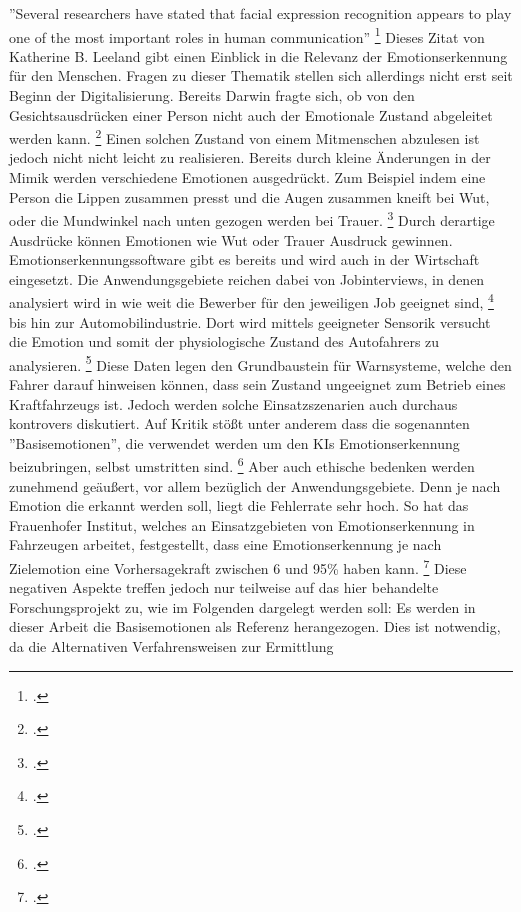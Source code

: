 \documentclass[12pt, a4paper]{scrbook}
\begin{document}
''Several researchers have stated that facial expression recognition appears to play one of the most important roles in human communication'' 
\footcite[Vgl.][1]{FaceRec}
Dieses Zitat von Katherine B. Leeland gibt einen Einblick in die Relevanz der Emotionserkennung für den Menschen. Fragen zu dieser Thematik stellen sich allerdings nicht erst seit Beginn der Digitalisierung. Bereits Darwin
fragte sich, ob von den Gesichtsausdrücken einer Person nicht auch der Emotionale Zustand abgeleitet werden kann.
\footcite[Vgl.][2]{FaceRec}
Einen solchen Zustand von einem Mitmenschen abzulesen ist jedoch nicht nicht leicht zu realisieren. Bereits durch kleine Änderungen in der Mimik werden verschiedene Emotionen ausgedrückt. Zum Beispiel indem eine Person die Lippen zusammen presst und die Augen zusammen kneift bei Wut, oder die Mundwinkel nach unten gezogen werden bei Trauer.
\footcite[Vgl.][249]{HandbookFaceRec}
Durch derartige Ausdrücke können Emotionen wie Wut oder Trauer Ausdruck gewinnen.
Emotionserkennungssoftware gibt es bereits und wird auch in der Wirtschaft eingesetzt. Die Anwendungsgebiete reichen dabei von Jobinterviews, in denen analysiert wird in wie weit die Bewerber für
den jeweiligen Job geeignet sind, 
\footcite[Vgl.][]{mixedArticle}
bis hin zur Automobilindustrie. Dort wird mittels geeigneter Sensorik versucht die Emotion und somit der physiologische Zustand des Autofahrers zu analysieren.
\footcite[Vgl.][Herausforderung]{Frauenhofer}
Diese Daten legen den Grundbaustein für Warnsysteme, welche den Fahrer darauf hinweisen können, dass sein Zustand ungeeignet zum Betrieb eines Kraftfahrzeugs ist. Jedoch werden
solche Einsatzszenarien auch durchaus kontrovers diskutiert. Auf Kritik stößt unter anderem dass die sogenannten ''Basisemotionen'', die verwendet werden um den KIs Emotionserkennung
beizubringen, selbst umstritten sind.
\footcite[Vgl.][]{SZ}
Aber auch ethische bedenken werden zunehmend geäußert, vor allem bezüglich der Anwendungsgebiete. Denn je nach Emotion die erkannt werden soll, liegt die Fehlerrate sehr hoch. So hat das
Frauenhofer Institut, welches an Einsatzgebieten von Emotionserkennung in Fahrzeugen arbeitet, festgestellt, dass eine Emotionserkennung je nach Zielemotion eine Vorhersagekraft zwischen 6 und
95\% haben kann.
\footcite[Vgl.][Ergebnis]{Frauenhofer}
Diese negativen Aspekte treffen jedoch nur teilweise auf das hier behandelte Forschungsprojekt zu, wie im Folgenden dargelegt werden soll:
Es werden in dieser Arbeit die Basisemotionen als Referenz herangezogen. Dies ist notwendig, da die Alternativen Verfahrensweisen zur Ermittlung
\end{document}
